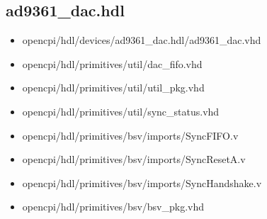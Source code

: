 \documentclass{article}
\def\comp{ad9361\_dac}
\begin{document}
\subsection*{\comp.hdl}
\begin{itemize}
	\item opencpi/hdl/devices/ad9361\_dac.hdl/ad9361\_dac.vhd
	\item opencpi/hdl/primitives/util/dac\_fifo.vhd
	\item opencpi/hdl/primitives/util/util\_pkg.vhd
	\item opencpi/hdl/primitives/util/sync\_status.vhd
	\item opencpi/hdl/primitives/bsv/imports/SyncFIFO.v
	\item opencpi/hdl/primitives/bsv/imports/SyncResetA.v
	\item opencpi/hdl/primitives/bsv/imports/SyncHandshake.v
	\item opencpi/hdl/primitives/bsv/bsv\_pkg.vhd
\end{itemize}
\end{document}
